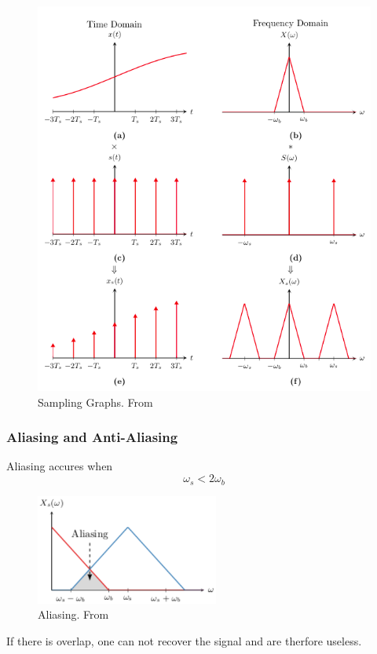 \newpage
\begin{figure}[!ht]
   \centering
   \includegraphics[width=12cm]{image/sampling_graphs.png} 
   \caption{Sampling Graphs. From \cite{}}
   \label{fig:sampling_graphs}
\end{figure}


\newpage
\subsubsection{Aliasing and Anti-Aliasing}
Aliasing accures when 
\begin{equation*}
    \omega_s < 2\omega_b
\end{equation*}

\begin{figure}[!ht]
    \centering
    \includegraphics[width=6cm]{image/aliasing.pdf}
    \caption{Aliasing. From \cite{}}
    \label{fig:aliasing}
\end{figure}
If there is overlap, one can not recover the signal and are therfore useless.

